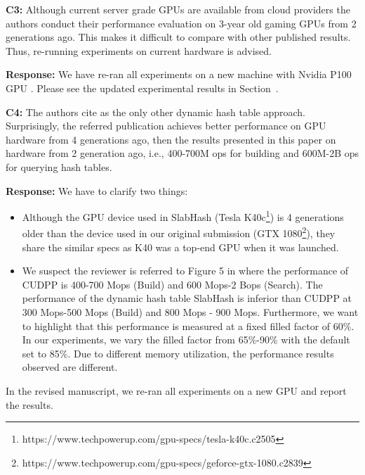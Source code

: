 \begin{shaded}
	\noindent\textbf{C3:} Although current server grade GPUs are available from cloud providers the authors conduct their performance evaluation on 3-year old gaming GPUs from 2 generations ago. This makes it difficult to compare with other published results. Thus, re-running experiments on current hardware is advised.
\end{shaded}
%
\noindent\textbf{Response:} 
We have re-ran all experiments on a new machine with Nvidia P100 GPU . Please see the updated experimental results in Section~.

\begin{shaded}
	\noindent\textbf{C4:} The authors cite \cite{ashkiani2018dynamic} as the only other dynamic hash table approach. Surprisingly, the referred publication achieves better performance on GPU hardware from 4 generations ago, then the results presented in this paper on hardware from 2 generation ago, i.e., 400-700M ops for building and 600M-2B ops for querying hash tables.
\end{shaded}
%
\noindent\textbf{Response:} 
We have to clarify two things: 
\begin{itemize}[noitemsep]
	\item Although the GPU device used in SlabHash \cite{ashkiani2018dynamic} (Tesla K40c\footnote{https://www.techpowerup.com/gpu-specs/tesla-k40c.c2505}) is 4 generations older than the device used in our original submission (GTX 1080\footnote{https://www.techpowerup.com/gpu-specs/geforce-gtx-1080.c2839}), they share the similar specs as K40 was a top-end GPU when it was launched. 
	\item We suspect the reviewer is referred to Figure 5 in \cite{ashkiani2018dynamic} where the performance of CUDPP is 400-700 Mops (Build) and 600 Mops-2 Bops (Search). The performance of the dynamic hash table SlabHash is inferior than CUDPP at 300 Mops-500 Mops (Build) and 800 Mops - 900 Mops. Furthermore, we want to highlight that this performance is measured at a fixed filled factor of 60\%. In our experiments, we vary the filled factor from 65\%-90\% with the default set to 85\%. Due to different memory utilization, the performance results observed are different.
\end{itemize}
%
In the revised manuscript, we re-ran all experiments on a new GPU and report the results.

